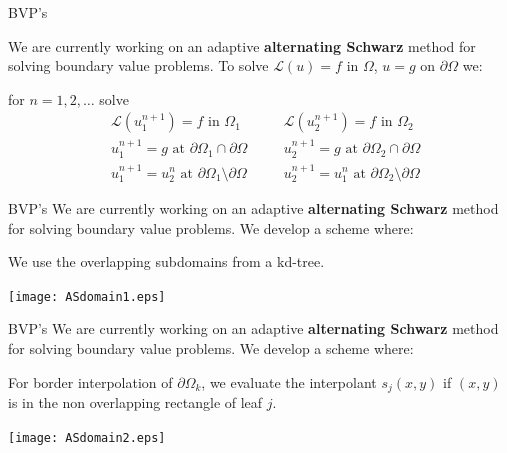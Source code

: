 \documentclass{beamer}
\begin{document}
\begin{frame}{BVP's}

		We are currently working on an adaptive \textbf{alternating Schwarz} method for solving boundary value problems. To solve $\mathcal{L}(u)=f$ in $\Omega$, $u=g$ on $\partial \Omega$ we:
\bigskip
	
	\begin{center}
	for $n=1,2,\dots$ solve
	\begin{equation*}
	\begin{aligned}
	&\mathcal{L}(u_1^{n+1})=f \text{ in } \Omega_1\\
	&u_1^{n+1} = g \text{ at } \partial\Omega_1 \cap \partial\Omega \\
	&u_1^{n+1} = u_2^{n} \text{ at } \partial\Omega_1 \setminus \partial\Omega 
	\end{aligned} \quad 	\begin{aligned}
	&\mathcal{L}(u_2^{n+1})=f \text{ in } \Omega_2 \\
	&u_2^{n+1} = g \text{ at } \partial\Omega_2 \cap \partial\Omega \\
	&u_2^{n+1} = u_1^{n} \text{ at } \partial\Omega_2 \setminus \partial\Omega 
	\end{aligned}
	\end{equation*}	
	\end{center}

\end{frame}

\begin{frame}{BVP's}
We are currently working on an adaptive \textbf{alternating Schwarz} method for solving boundary value problems. We develop a scheme where:

\bigskip

We use the overlapping subdomains from a kd-tree.

	\begin{center}
		\texttt{[image: ASdomain1.eps]}
	\end{center}
\end{frame}

\begin{frame}{BVP's}
		We are currently working on an adaptive \textbf{alternating Schwarz} method for solving boundary value problems. We develop a scheme where:
\bigskip

		For border interpolation of $\partial \Omega_k$, we evaluate the interpolant $s_j(x,y)$ if $(x,y)$ is in the non overlapping rectangle of leaf $j$.
\bigskip

	\begin{center}
		\texttt{[image: ASdomain2.eps]}
	\end{center}
\end{frame}
\end{document}
